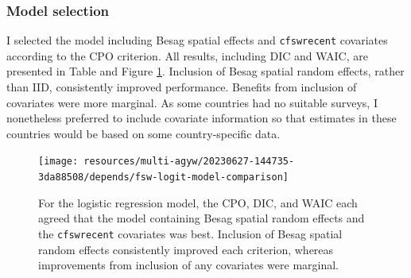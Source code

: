 \documentclass[a4paper, nobind]{templates/ociamthesis}
\begin{document}
\hypertarget{model-selection-1}{%
\subsubsection{Model selection}\label{model-selection-1}}

I selected the model including Besag spatial effects and \texttt{cfswrecent} covariates according to the CPO criterion.
All results, including DIC and WAIC, are presented in Table and Figure \ref{fig:fsw-logit-model-comparison}.
Inclusion of Besag spatial random effects, rather than IID, consistently improved performance.
Benefits from inclusion of covariates were more marginal.
As some countries had no suitable surveys, I nonetheless preferred to include covariate information so that estimates in these countries would be based on some country-specific data.



\begin{figure}
\texttt{[image: resources/multi-agyw/20230627-144735-3da88508/depends/fsw-logit-model-comparison]} \caption{For the logistic regression model, the CPO, DIC, and WAIC each agreed that the model containing Besag spatial random effects and the \texttt{cfswrecent} covariates was best. Inclusion of Besag spatial random effects consistently improved each criterion, whereas improvements from inclusion of any covariates were marginal.}\label{fig:fsw-logit-model-comparison}
\end{figure}
\end{document}
